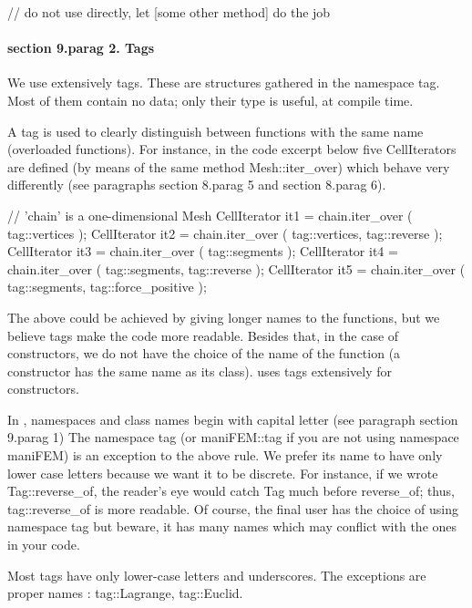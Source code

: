 \verbatim
   // do not use directly, let [some other method] do the job
\endverbatim


\paragraph{\numb section 9.\numb parag 2. Tags}

We use extensively {\codett tag}s.
These are structures gathered in the {\codett namespace tag}.
Most of them contain no data; only their type is useful, at compile time.

A {\codett tag} is used to clearly distinguish between functions with the same name
(overloaded functions).
For instance, in the code excerpt below five {\codett CellIterator}s are defined
(by means of the same method {\codett Mesh::iter\_over}) which
behave very differently (see paragraphs \numb section 8.\numb parag 5 and
\numb section 8.\numb parag 6).

\verbatim
   // 'chain' is a one-dimensional Mesh
   CellIterator it1 = chain.iter_over ( tag::vertices );
   CellIterator it2 = chain.iter_over ( tag::vertices, tag::reverse );
   CellIterator it3 = chain.iter_over ( tag::segments );
   CellIterator it4 = chain.iter_over ( tag::segments, tag::reverse );
   CellIterator it5 = chain.iter_over ( tag::segments, tag::force_positive );
\endverbatim

The above could be achieved by giving longer names to the functions, but we believe
{\codett tag}s make the code more readable.
Besides that, in the case of constructors, we do not have the choice of the name of the function
(a constructor has the same name as its class).
{\ManiFEM} uses {\codett tag}s extensively for constructors.

In \maniFEM, namespaces and class names begin with capital letter
(see paragraph \numb section 9.\numb parag 1)
The namespace {\codett tag} (or {\codett maniFEM::tag} if you are not
{\codett using namespace maniFEM}) is an exception to the above rule.
We prefer its name to have only lower case letters because we want it to be
discrete. For instance, if we wrote {\codett Tag::reverse\_of},
the reader's eye would catch {\codett Tag} much before {\codett reverse\_of};
thus, {\codett tag::reverse\_of} is more readable.
Of course, the final user has the choice of {\codett using namespace tag}
but beware, it has many names which may conflict with the ones in your code.

Most tags have only lower-case letters and underscores.
The exceptions are proper names : {\codett tag::Lagrange}, {\codett tag::Euclid}.


